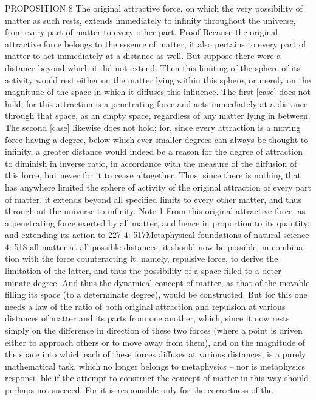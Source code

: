 PROPOSITION 8
The original attractive force, on which the very possibility of matter as
such rests, extends immediately to inﬁnity throughout the universe, from
every part of matter to every other part.
Proof
Because the original attractive force belongs to the essence of matter, it
also pertains to every part of matter to act immediately at a distance as
well. But suppose there were a distance beyond which it did not extend.
Then this limiting of the sphere of its activity would rest either on the
matter lying within this sphere, or merely on the magnitude of the space
in which it diffuses this inﬂuence. The ﬁrst [case] does not hold; for
this attraction is a penetrating force and acts immediately at a distance
through that space, as an empty space, regardless of any matter lying
in between. The second [case] likewise does not hold; for, since every
attraction is a moving force having a degree, below which ever smaller
degrees can always be thought to inﬁnity, a greater distance would indeed
be a reason for the degree of attraction to diminish in inverse ratio, in
accordance with the measure of the diffusion of this force, but never for
it to cease altogether. Thus, since there is nothing that has anywhere
limited the sphere of activity of the original attraction of every part of
matter, it extends beyond all speciﬁed limits to every other matter, and
thus throughout the universe to inﬁnity.
Note 1
From this original attractive force, as a penetrating force exerted by all
matter, and hence in proportion to its quantity, and extending its action to
227
4: 517Metaphysical foundations of natural science
4: 518
all matter at all possible distances, it should now be possible, in combina-
tion with the force counteracting it, namely, repulsive force, to derive the
limitation of the latter, and thus the possibility of a space ﬁlled to a deter-
minate degree. And thus the dynamical concept of matter, as that of the
movable ﬁlling its space (to a determinate degree), would be constructed.
But for this one needs a law of the ratio of both original attraction and
repulsion at various distances of matter and its parts from one another,
which, since it now rests simply on the difference in direction of these
two forces (where a point is driven either to approach others or to move
away from them), and on the magnitude of the space into which each of
these forces diffuses at various distances, is a purely mathematical task,
which no longer belongs to metaphysics – nor is metaphysics responsi-
ble if the attempt to construct the concept of matter in this way should
perhaps not succeed. For it is responsible only for the correctness of the
